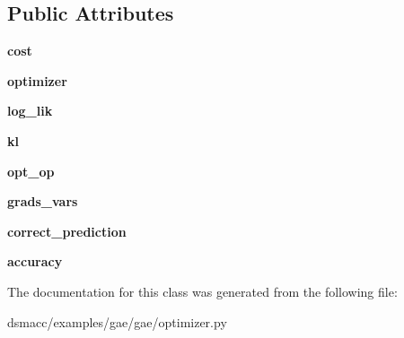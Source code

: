 \subsection*{Public Attributes}
\begin{DoxyCompactItemize}
\item 
\mbox{\label{classgae_1_1optimizer_1_1OptimizerVAE_a976ed48b252d56325149631bece9ddbe}} 
{\bfseries cost}
\item 
\mbox{\label{classgae_1_1optimizer_1_1OptimizerVAE_a92bbc4edac1c0e5289a908eaf17342b2}} 
{\bfseries optimizer}
\item 
\mbox{\label{classgae_1_1optimizer_1_1OptimizerVAE_a162cde4e635cd18f23db99b778b0a641}} 
{\bfseries log\+\_\+lik}
\item 
\mbox{\label{classgae_1_1optimizer_1_1OptimizerVAE_a5ec8d0f9787e7c526ebb6187510951c0}} 
{\bfseries kl}
\item 
\mbox{\label{classgae_1_1optimizer_1_1OptimizerVAE_a3580d0c4f6b0635a7f89a946761e8540}} 
{\bfseries opt\+\_\+op}
\item 
\mbox{\label{classgae_1_1optimizer_1_1OptimizerVAE_afe4cd0d16d19b53f17593ef188d3f037}} 
{\bfseries grads\+\_\+vars}
\item 
\mbox{\label{classgae_1_1optimizer_1_1OptimizerVAE_a61745db8534f5ab56c5c6e71ae72018c}} 
{\bfseries correct\+\_\+prediction}
\item 
\mbox{\label{classgae_1_1optimizer_1_1OptimizerVAE_a4a0e36bc74336d0f1746d859647eee7f}} 
{\bfseries accuracy}
\end{DoxyCompactItemize}


The documentation for this class was generated from the following file\+:\begin{DoxyCompactItemize}
\item 
dsmacc/examples/gae/gae/optimizer.\+py\end{DoxyCompactItemize}
